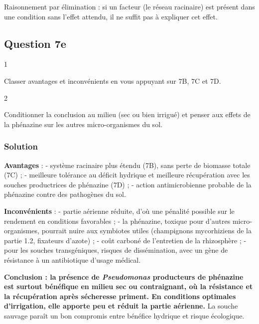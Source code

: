 \documentclass[11pt,a4paper]{article}
\begin{document}
\begin{methode}

Raisonnement par élimination : si un facteur (le réseau racinaire) est présent dans une condition sans l'effet attendu, il ne suffit pas à expliquer cet effet.

\end{methode}

\hypertarget{question-7e}{%
\subsection{Question 7e}\label{question-7e}}

\begin{indication}{1}

Classer avantages et inconvénients en vous appuyant sur 7B, 7C et 7D.

\end{indication}

\begin{indication}{2}

Conditionner la conclusion au milieu (sec ou bien irrigué) et penser aux effets de la phénazine sur les autres micro-organismes du sol.

\end{indication}

\hypertarget{solution-19}{%
\subsubsection{Solution}\label{solution-19}}

\textbf{Avantages} :
- système racinaire plus étendu (7B), sans perte de biomasse totale (7C) ;
- meilleure tolérance au déficit hydrique et meilleure récupération avec les souches productrices de phénazine (7D) ;
- action antimicrobienne probable de la phénazine contre des pathogènes du sol.

\textbf{Inconvénients} :
- partie aérienne réduite, d'où une pénalité possible sur le rendement en conditions favorables ;
- la phénazine, toxique pour d'autres micro-organismes, pourrait nuire aux symbiotes utiles (champignons mycorhiziens de la partie 1.2, fixateurs d'azote) ;
- coût carboné de l'entretien de la rhizosphère ;
- pour les souches transgéniques, risques de dissémination, avec un gène de résistance à un antibiotique d'usage médical.

\textbf{Conclusion : la présence de \emph{Pseudomonas} producteurs de phénazine est surtout bénéfique en milieu sec ou contraignant, où la résistance et la récupération après sécheresse priment. En conditions optimales d'irrigation, elle apporte peu et réduit la partie aérienne.} La souche sauvage paraît un bon compromis entre bénéfice hydrique et risque écologique.
\end{document}
